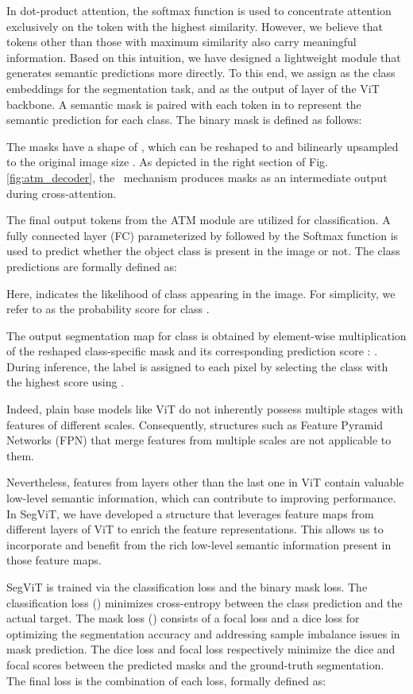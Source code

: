 In dot-product attention, the softmax function is used to concentrate attention exclusively on the token with the highest similarity. However, we believe that tokens other than those with maximum similarity also carry meaningful information. Based on this intuition, we have designed a lightweight module that generates semantic predictions more directly.
To this end, we assign  as the class embeddings for the segmentation task, and  as the output of layer  of the ViT backbone. A semantic mask is paired with each token in  to represent the semantic prediction for each class. The binary mask  is defined as follows:

The masks have a shape of , which can be reshaped to  and bilinearly upsampled to the original image size . As depicted in the right section of Fig. \ref{fig:atm_decoder}, the \atm\ mechanism produces masks as an intermediate output during cross-attention. 

The final output tokens  from the ATM module are utilized for classification. A fully connected layer (FC) parameterized by  followed by the Softmax function is used to predict whether the object class is present in the image or not. The class predictions  are formally defined as:


Here,  indicates the likelihood of class  appearing in the image. For simplicity, we refer to  as the probability score for class . 

The output segmentation map for class  is obtained by element-wise multiplication of the reshaped class-specific mask  and its corresponding prediction score : . During inference, the label is assigned to each pixel  by selecting the class with the highest score using .

Indeed, plain base models like ViT do not inherently possess multiple stages with features of different scales. Consequently, structures such as Feature Pyramid Networks (FPN) that merge features from multiple scales are not applicable to them.

Nevertheless, features from layers other than the last one in ViT contain valuable low-level semantic information, which can contribute to improving performance. In SegViT, we have developed a structure that leverages feature maps from different layers of ViT to enrich the feature representations. This allows us to incorporate and benefit from the rich low-level semantic information present in those feature maps.

SegViT is trained via the classification loss and the binary mask loss. The classification loss () minimizes cross-entropy between the class prediction and the actual target. The mask loss () consists of a focal loss \cite{lin2017focal} and a dice loss \cite{diceloss} for optimizing the segmentation accuracy and addressing sample imbalance issues in mask prediction. The dice loss and focal loss respectively minimize the dice and focal scores between the predicted masks and the ground-truth segmentation. The final loss is the combination of each loss, formally defined as:


